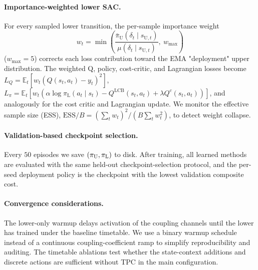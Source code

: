 \paragraph{Importance-weighted lower SAC.}
For every sampled lower transition, the per-sample importance weight
\[
w_t = \min\!\left(\frac{\bar{\pi}_{\mathrm U}(\delta_{t} \mid s_{\mathrm U,t})}{\mu(\delta_{t} \mid s_{\mathrm U,t})},\ w_{\max}\right)
\]
($w_{\max} = 5$) corrects each loss contribution toward the EMA "deployment" upper distribution.
The weighted Q, policy, cost-critic, and Lagrangian losses become $L_Q = \mathbb{E}_t[w_t (Q(s_t, a_t) - y_t)^2]$,
$L_\pi = \mathbb{E}_t[w_t (\alpha \log \pi_{\mathrm L}(a_t\mid s_t) - Q^{\mathrm{LCB}}(s_t, a_t) + \lambda Q^c(s_t, a_t))]$, and analogously for the cost critic and Lagrangian update.
We monitor the effective sample size (ESS), $\mathrm{ESS}/B = (\sum_t w_t)^2 / (B \sum_t w_t^2)$, to detect weight collapse.

\paragraph{Validation-based checkpoint selection.}
Every $50$ episodes we save $(\pi_{\mathrm{U}}, \pi_{\mathrm{L}})$ to disk. After training, all learned methods are evaluated with the same held-out checkpoint-selection protocol, and the per-seed deployment policy is the checkpoint with the lowest validation composite cost.

\paragraph{Convergence considerations.}
The lower-only warmup delays activation of the coupling channels until the lower has trained under the baseline timetable.
We use a binary warmup schedule instead of a continuous coupling-coefficient ramp to simplify reproducibility and auditing. The timetable ablations test whether the state-context additions and discrete actions are sufficient without TPC in the main configuration.
